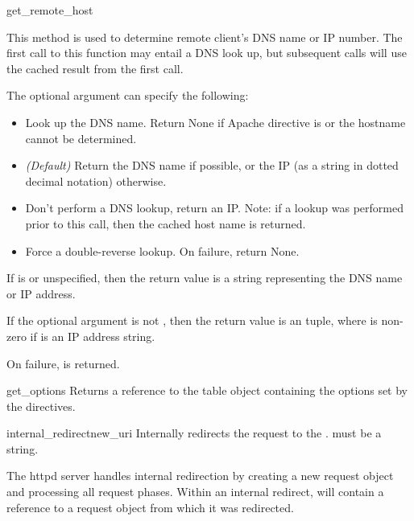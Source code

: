 \begin{methoddesc}[request]{get_remote_host}{}

This method is used to determine remote client's DNS name or IP
number. The first call to this function may entail a DNS look up, but
subsequent calls will use the cached result from the first call.

The optional  argument can specify the following: 

\begin{itemize}

\item
{} Look up the DNS name. Return None if Apache
directive  is  or the hostname cannot
be determined.

\item                  
{} \emph{(Default)} Return the DNS name if
possible, or the IP (as a string in dotted decimal notation)
otherwise.

\item
{} Don't perform a DNS lookup, return an
IP. Note: if a lookup was performed prior to this call, then the
cached host name is returned.

\item
{} Force a double-reverse lookup. On 
failure, return None.

\end{itemize}

If  is  or unspecified, then the return
value is a string representing the DNS name or IP address.

If the optional  argument is not , then the
return value is an  tuple, where 
is non-zero if  is an IP address string.

On failure,  is returned.

\end{methoddesc}

\begin{methoddesc}[request]{get_options}{}
Returns a reference to the table object containing the options set by
the  directives.
\end{methoddesc}

\begin{methoddesc}[request]{internal_redirect}{new_uri}
Internally redirects the request to the . 
must be a string.

The httpd server handles internal redirection by creating a new
request object and processing all request phases. Within an internal
redirect,  will contain a reference to a request object
from which it was redirected.

\end{methoddesc}

